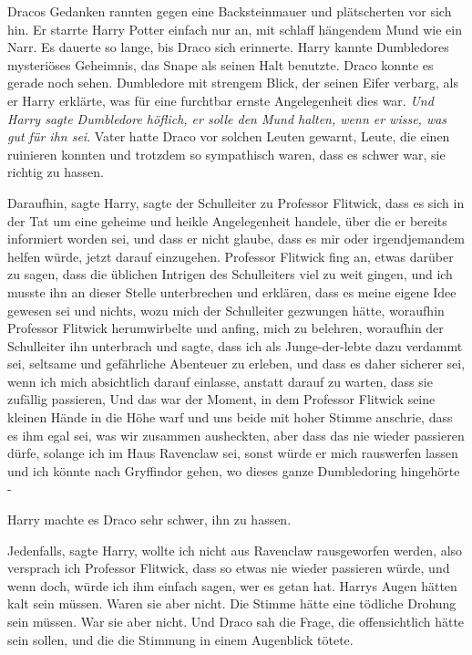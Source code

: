 Dracos Gedanken rannten gegen eine Backsteinmauer und plätscherten vor sich hin.
Er starrte Harry Potter einfach nur an, mit schlaff hängendem Mund wie ein Narr.
Es dauerte so lange, bis Draco sich erinnerte. Harry kannte Dumbledores
mysteriöses Geheimnis, das Snape als seinen Halt benutzte. Draco konnte es
gerade noch sehen. Dumbledore mit strengem Blick, der seinen Eifer verbarg, als
er Harry erklärte, was für eine furchtbar ernste Angelegenheit dies war.
\emph{Und Harry sagte Dumbledore höflich, er solle den Mund halten, wenn er
wisse, was gut für ihn sei}. Vater hatte Draco vor solchen Leuten gewarnt,
Leute, die einen ruinieren konnten und trotzdem so sympathisch waren, dass es
schwer war, sie richtig zu hassen.

\glqq{}Daraufhin\grqq{}, sagte Harry, \glqq{}sagte der Schulleiter zu Professor
Flitwick, dass es sich in der Tat um eine geheime und heikle Angelegenheit
handele, über die er bereits informiert worden sei, und dass er nicht glaube,
dass es mir oder irgendjemandem helfen würde, jetzt darauf einzugehen. Professor
Flitwick fing an, etwas darüber zu sagen, dass die üblichen Intrigen des
Schulleiters viel zu weit gingen, und ich musste ihn an dieser Stelle
unterbrechen und erklären, dass es meine eigene Idee gewesen sei und nichts,
wozu mich der Schulleiter gezwungen hätte, woraufhin Professor Flitwick
herumwirbelte und anfing, mich zu belehren, woraufhin der Schulleiter ihn
unterbrach und sagte, dass ich als Junge-der-lebte dazu verdammt sei, seltsame
und gefährliche Abenteuer zu erleben, und dass es daher sicherer sei, wenn ich
mich absichtlich darauf einlasse, anstatt darauf zu warten, dass sie zufällig
passieren, Und das war der Moment, in dem Professor Flitwick seine kleinen Hände
in die Höhe warf und uns beide mit hoher Stimme anschrie, dass es ihm egal sei,
was wir zusammen ausheckten, aber dass das nie wieder passieren dürfe, solange
ich im Haus Ravenclaw sei, sonst würde er mich rauswerfen lassen und ich könnte
nach Gryffindor gehen, wo dieses ganze Dumbledoring hingehörte -\grqq{}

Harry machte es Draco sehr schwer, ihn zu hassen.

\glqq{}Jedenfalls\grqq{}, sagte Harry, \glqq{}wollte ich nicht aus Ravenclaw
rausgeworfen werden, also versprach ich Professor Flitwick, dass so etwas nie
wieder passieren würde, und wenn doch, würde ich ihm einfach sagen, wer es getan
hat.\grqq{} Harrys Augen hätten kalt sein müssen. Waren sie aber nicht. Die
Stimme hätte eine tödliche Drohung sein müssen. War sie aber nicht. Und Draco
sah die Frage, die offensichtlich hätte sein sollen, und die die Stimmung in
einem Augenblick tötete.

